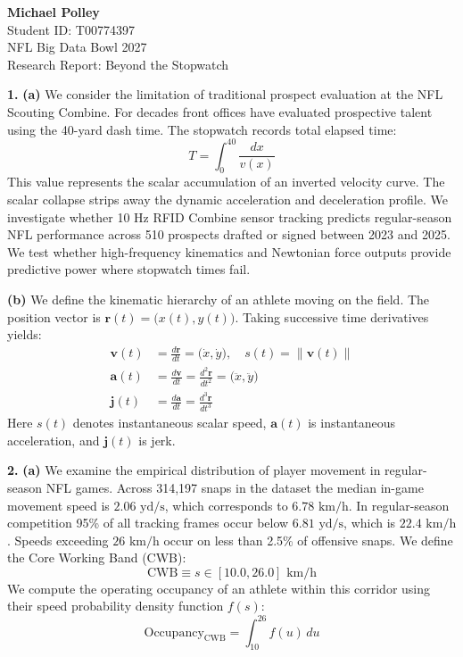\documentclass[11pt]{article}
\begin{document}
\begin{center}
    \vspace*{5cm}
    {\LARGE \textbf{Michael Polley}} \\[2em]
    \normalsize Student ID: T00774397 \\[2em]
    NFL Big Data Bowl 2027 \\[2em]
    Research Report: Beyond the Stopwatch
    \vfill
\end{center}
\thispagestyle{empty}
\newpage

\noindent\textbf{1.}
\noindent\textbf{(a)}
We consider the limitation of traditional prospect evaluation at the NFL Scouting Combine. For decades front offices have evaluated prospective talent using the 40-yard dash time. The stopwatch records total elapsed time:
\[ T = \int_{0}^{40} \frac{dx}{v(x)} \]
This value represents the scalar accumulation of an inverted velocity curve. The scalar collapse strips away the dynamic acceleration and deceleration profile. We investigate whether 10 Hz RFID Combine sensor tracking predicts regular-season NFL performance across 510 prospects drafted or signed between 2023 and 2025. We test whether high-frequency kinematics and Newtonian force outputs provide predictive power where stopwatch times fail.

\noindent\textbf{(b)}
We define the kinematic hierarchy of an athlete moving on the field. The position vector is $\mathbf{r}(t) = \big(x(t), y(t)\big)$. Taking successive time derivatives yields:
\begin{align*}
    \mathbf{v}(t) &= \frac{d\mathbf{r}}{dt} = \big(\dot{x}, \dot{y}\big), \quad s(t) = \|\mathbf{v}(t)\| \\
    \mathbf{a}(t) &= \frac{d\mathbf{v}}{dt} = \frac{d^2\mathbf{r}}{dt^2} = \big(\ddot{x}, \ddot{y}\big) \\
    \mathbf{j}(t) &= \frac{d\mathbf{a}}{dt} = \frac{d^3\mathbf{r}}{dt^3}
\end{align*}
Here $s(t)$ denotes instantaneous scalar speed, $\mathbf{a}(t)$ is instantaneous acceleration, and $\mathbf{j}(t)$ is jerk.

\noindent\textbf{2.}
\noindent\textbf{(a)}
We examine the empirical distribution of player movement in regular-season NFL games. Across 314,197 snaps in the dataset the median in-game movement speed is $2.06 \text{ yd/s}$, which corresponds to $6.78 \text{ km/h}$. In regular-season competition 95\% of all tracking frames occur below $6.81 \text{ yd/s}$, which is $22.4 \text{ km/h}$. Speeds exceeding $26 \text{ km/h}$ occur on less than 2.5\% of offensive snaps. We define the Core Working Band (CWB):
\[ \text{CWB} \equiv s \in [10.0, 26.0] \text{ km/h} \]
We compute the operating occupancy of an athlete within this corridor using their speed probability density function $f(s)$:
\[ \text{Occupancy}_{\text{CWB}} = \int_{10}^{26} f(u)\,du \]
\end{document}
